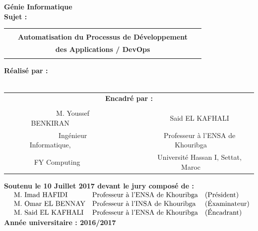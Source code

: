 \documentclass[a4paper,11pt,oneside]{report}
\begin{document}
\begin{titlepage}
        \vspace{0.5em}
    {\LARGE \textbf{G\'enie Informatique}}\\
        \vfill
    {\large \textbf{Sujet :}}\\
        \vspace{1em} 
    \begin{tabular}{|c|}
    \hline
     \\
    \ \ \ {\LARGE \textbf{Automatisation du Processus de Développement}}\ \ \ \\
    {\LARGE \textbf{des Applications / DevOps}}\\
     \\
    \hline
    \end{tabular}
    \vfill
         {\large \textbf{Réalisé par :}}\\
        \vspace{0.5em}
    {\large \@author} \\
        \vfill
    \begin{tabular}{c c}
    \multicolumn{2}{c}{{\large \textbf{Encadré par :}}} \\
     & \\
    \ \ \ \ {\large M. Youssef BENKIRAN}\ \ \ \ \ \ \ \ \ & \ \ \ \ \ {\large Said EL KAFHALI} \\
    \ \ \ \ {\large Ingénieur Informatique,}\ \ \ \ \ \ \ \ \ & \ \ \ \ \ {\large Professeur à l'ENSA de Khouribga}\\
    \ \ \ \ {\large FY Computing}\ \ \ \ \ \ \ \ \ & \ \ \ \ \ {\large Université Hassan I, Settat, Maroc}\\
    \end{tabular}
        \vfill
    {\large \textbf{Soutenu le 10 Juillet 2017 devant le jury composé de :}}\\
    \ \newline
        $\begin{array}{l l l}
        \text{M. Imad HAFIDI} & \text{Professeur à l'ENSA de Khouribga} & \text{(Président)} \\
        \text{M. Omar EL BENNAY} & \text{Professeur à l'INSA de Khouribga} & \text{(\'Examinateur)} \\
        \text{M. Said EL KAFHALI} & \text{Professeur à l'ENSA de Khouribga} & \text{(\'Encadrant)} \\
        \end{array}$\\
        \vfill
    {\large \textbf{Année universitaire : 2016/2017}}
  \end{titlepage}
\end{document}
